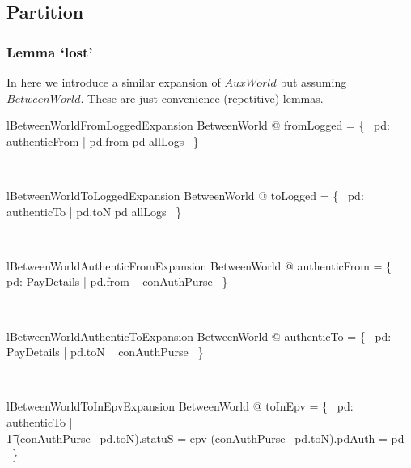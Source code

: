 \subsection{Partition}\label{ch10.partition}

\subsubsection{Lemma `lost' }

In here we introduce a similar expansion of $AuxWorld$ but assuming $BetweenWorld$. These are
just convenience (repetitive) lemmas.
%
\begin{LNewLemma}
\begin{theorem}{lBetweenWorldFromLoggedExpansion}
    \forall  BetweenWorld @ fromLogged = \{~  pd: authenticFrom | pd.from \mapsto  pd \in  allLogs ~\}
\end{theorem}~\end{LNewLemma}

\begin{LNewLemma}
\begin{theorem}{lBetweenWorldToLoggedExpansion}
   \forall  BetweenWorld @ toLogged = \{~  pd: authenticTo | pd.toN \mapsto  pd \in  allLogs ~\}
\end{theorem}~\end{LNewLemma}

\begin{LNewLemma}
\begin{theorem}{lBetweenWorldAuthenticFromExpansion}
    \forall BetweenWorld @ authenticFrom = \{~  pd: PayDetails | pd.from \in  \dom~ conAuthPurse ~\}
\end{theorem}~\end{LNewLemma}

\begin{LNewLemma}
\begin{theorem}{lBetweenWorldAuthenticToExpansion}
    \forall BetweenWorld @ authenticTo = \{~  pd: PayDetails | pd.toN \in  \dom~ conAuthPurse ~\}
\end{theorem}~\end{LNewLemma}

\begin{LNewLemma}
\begin{theorem}{lBetweenWorldToInEpvExpansion}
    \forall  BetweenWorld @ toInEpv = \{~  pd: authenticTo | \\
        \t1 (conAuthPurse~ pd.toN).statuS = epv \land  (conAuthPurse~ pd.toN).pdAuth = pd ~\}
\end{theorem}~\end{LNewLemma}

